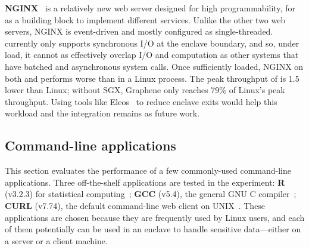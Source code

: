 {\bf NGINX}~\cite{nginx} is a relatively new web server designed for high programmability, for as a building block to implement different services.
Unlike the other two web servers, NGINX is event-driven and mostly configured as single-threaded.
\graphenesgx{} currently only supports synchronous I/O at the enclave boundary,
and so, under load, it cannot as effectively overlap I/O and computation
as other systems that have batched and asynchronous system calls.
Once sufficiently loaded, NGINX on both \graphene{} and \graphenesgx{} 
performs worse than in a  Linux process. %
The peak throughput of \graphenesgx{} is 1.5\x{} lower than Linux;
without SGX, Graphene only reaches 79\% of Linux's peak throughput.
Using tools like Eleos~\cite{orenbach17eleos} to reduce enclave exits would help this workload and the integration remains as future work.





\subsection{Command-line applications}


This section evaluates the performance of a few commonly-used command-line applications.
Three off-the-shelf applications are tested in the experiment:
{\bf R} (v3.2.3) for statistical computing~\cite{r-project}; {\bf GCC} (v5.4), the general GNU C compiler~\cite{gcc}; {\bf CURL} (v7.74), the default command-line web client on UNIX~\cite{curl}.
These applications are chosen because they are frequently used by Linux users,
and each of them potentially can be used 
in an enclave to handle sensitive data---either on a server or a client
machine.



